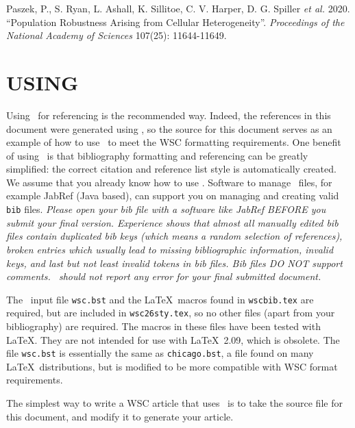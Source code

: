 \documentclass{wscpaperproc}
\theoremstyle{wsc}
\begin{document}
{\footnotesize
\begin{hangref}
\item Paszek, P., S. Ryan, L. Ashall, K. Sillitoe, C. V. Harper, D. G. Spiller \textit{et al.} 2020. ``Population Robustness Arising from Cellular Heterogeneity''. \textit{Proceedings of the National Academy of Sciences} 107(25): 11644-11649.
\end{hangref}
}

\section{USING \texorpdfstring{\BibTeX}{BibTex}}
\label{sec:bibtex}
Using \BibTeX\ for referencing is the recommended way. Indeed, the references in this document were generated using \BibTeX, so the source for this
document serves as an example of how to use \BibTeX\ to meet the WSC formatting requirements.
One benefit of using \BibTeX\ is that bibliography formatting and referencing can be greatly simplified: the correct citation and reference list style is automatically created.
We assume that you already know how to use \BibTeX.
Software to manage \BibTeX\ files, for example JabRef (Java based), can support you on managing and creating valid {\tt bib} files.
{\em Please open your bib file with a software like JabRef BEFORE you submit your final version. Experience shows that almost all manually edited bib files contain duplicated bib keys (which means a random selection of references), broken entries which usually lead to missing bibliographic information, invalid keys, and last but not least invalid tokens in bib files. Bib files DO NOT support comments. \BibTeX\ should not report any error for your final submitted document.}

The \BibTeX\ input file {\tt wsc.bst} and the \LaTeX\ macros found in {\tt wscbib.tex} are required, but are included in {\tt wsc26sty.tex}, so no other files (apart from your bibliography) are required.
The macros in these files have been tested with \LaTeX. They are not intended for use with \LaTeX\ 2.09, which is obsolete.
The file {\tt wsc.bst} is essentially the same as {\tt chicago.bst}, a file found on many \LaTeX\ distributions, but is
modified to be more compatible with WSC format requirements.

The simplest way to write a WSC article that uses \BibTeX\ is to take the source file for this document, and modify it to generate your article. %
\end{document}
